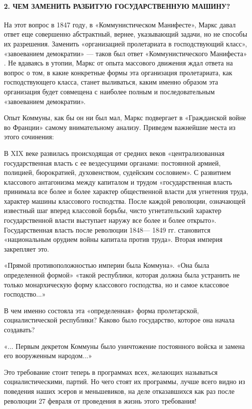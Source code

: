 \documentclass[12pt]{article}
\newcommand{\parnum}{(\arabic{parcount})}
\newcounter{parcount}
\newenvironment{parnumbers}{%
  \par%
  \everypar{\noindent \stepcounter{parcount}\marginpar[]{\parnum}}%
}{}
\begin{document}
\paragraph{2. ЧЕМ ЗАМЕНИТЬ РАЗБИТУЮ ГОСУДАРСТВЕННУЮ МАШИНУ?}
\begin{parnumbers}
На этот вопрос в 1847 году, в «Коммунистическом Манифесте», Маркс давал ответ еще совершенно абстрактный, вернее, указывающий задачи, но не способы их разрешения. Заменить «организацией пролетариата в господствующий класс», «завоеванием демократии» — таков был ответ «Коммунистического Манифеста» . Не вдаваясь в утопии, Маркс от опыта массового движения ждал ответа на вопрос о том, в какие конкретные формы эта организация пролетариата, как господствующего класса, станет выливаться, каким именно образом эта организация будет совмещена с наиболее полным и последовательным «завоеванием демократии».

Опыт Коммуны, как бы он ни был мал, Маркс подвергает в «Гражданской войне во Франции» самому внимательному анализу. Приведем важнейшие места из этого сочинения:

В XIX веке развилась происходящая от средних веков «централизованная государственная власть с ее вездесущими органами: постоянной армией, полицией, бюрократией, духовенством, судейским сословием». С развитием классового антагонизма между капиталом и трудом «государственная власть принимала все более и более характер общественной власти для угнетения труда, характер машины классового господства. После каждой революции, означающей известный шаг вперед классовой борьбы, чисто угнетательский характер государственной власти выступает наружу все более и более открыто». Государственная власть после революции 1848— 1849 гг. становится «национальным орудием войны капитала против труда». Вторая империя закрепляет это.

«Прямой противоположностью империи была Коммуна». «Она была определенной формой» «такой республики, которая должна была устранить не только монархическую форму классового господства, но и самое классовое господство...»

В чем именно состояла эта «определенная» форма пролетарской, социалистической республики? Каково было государство, которое она начала создавать?

«... Первым декретом Коммуны было уничтожение постоянного войска и замена его вооруженным народом...»

Это требование стоит теперь в программах всех, желающих называться социалистическими, партий. Но чего стоят их программы, лучше всего видно из поведения наших эсеров и меньшевиков, на деле отказавшихся как раз после революции 27 февраля от проведения в жизнь этого требования!


\end{parnumbers}
\end{document}
